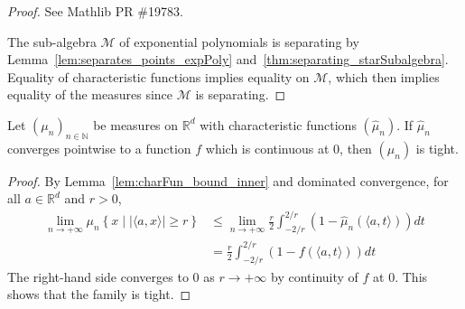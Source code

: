 \begin{proof}\leanok
See Mathlib PR \#19783.

The sub-algebra $\mathcal M$ of exponential polynomials is separating by Lemma~\ref{lem:separates_points_expPoly} and~\ref{thm:separating_starSubalgebra}.
Equality of characteristic functions implies equality on $\mathcal M$, which then implies equality of the measures since $\mathcal M$ is separating.
\end{proof}






\begin{lemma}\label{lem:tight_of_tendsto_charFun}
\leanok
{}
Let $(\mu_n)_{n \in \mathbb{N}}$ be measures on $\mathbb{R}^d$ with characteristic functions $(\hat{\mu}_n)$. If $\hat{\mu}_n$ converges pointwise to a function $f$ which is continuous at 0, then $(\mu_n)$ is tight.
\end{lemma}

\begin{proof}
\leanok
By Lemma~\ref{lem:charFun_bound_inner} and dominated convergence, for all $a \in \mathbb{R}^d$ and $r > 0$,
\begin{align*}
    \lim_{n \to +\infty} \mu_n \left\{x \mid |\langle a, x\rangle| \ge r\right\}
    &\le \lim_{n \to +\infty} \frac{r}{2} \int_{-2/r}^{2/r} (1 - \hat{\mu}_n(\langle a, t\rangle))dt
    \\
    &= \frac{r}{2} \int_{-2/r}^{2/r} (1 - f(\langle a, t\rangle))dt
\end{align*}
The right-hand side converges to 0 as $r \to +\infty$ by continuity of $f$ at 0.
This shows that the family is tight.
\end{proof}

